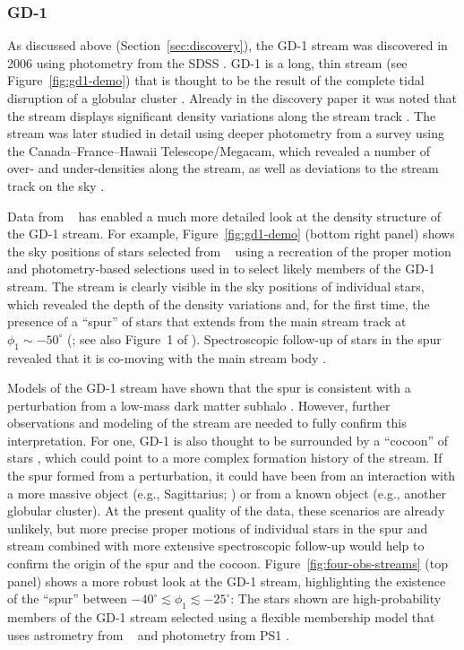 \documentclass[final,5p,times,twocolumn,authoryear]{elsarticle}
\begin{document}
\subsubsection{GD-1}
\label{sec:gd1}

As discussed above (Section~\ref{sec:discovery}), the GD-1 stream was discovered in 2006
using photometry from the SDSS \citep{grillmair:2006-gd1}.
GD-1 is a long, thin stream (see Figure~\ref{fig:gd1-demo}) that is thought to be the
result of the complete tidal disruption of a globular cluster \citep{koposov:2010}.
Already in the discovery paper it was noted that the stream displays significant density
variations along the stream track \citep{grillmair:2006-gd1}.
The stream was later studied in detail using deeper photometry from a survey using the
Canada--France--Hawaii Telescope/Megacam, which revealed a number of over- and
under-densities along the stream, as well as deviations to the stream track
on the sky \citep{deboer:2018}.

Data from \gaia\  has enabled a much more detailed look at the density structure
of the GD-1 stream.
For example, Figure~\ref{fig:gd1-demo} (bottom right panel) shows the sky positions of
stars selected from \gaia\  using a recreation of the proper motion and
photometry-based selections used in \citep{price-whelan:2018} to select likely members
of the GD-1 stream.
The stream is clearly visible in the sky positions of individual stars, which revealed
the depth of the density variations and, for the first time, the presence of a ``spur''
of stars that extends from the main stream track at $\phi_1 \sim -50^\circ$
(\citealt{price-whelan:2018}; see also Figure~1 of \citealt{bonaca:2019b}).
Spectroscopic follow-up of stars in the spur revealed that it is co-moving with the main
stream body \citep{bonaca:2020b}.

Models of the GD-1 stream have shown that the spur is consistent with a perturbation
from a low-mass dark matter subhalo \citep{bonaca:2019, bonaca:2020b}.
However, further observations and modeling of the stream are needed to fully confirm
this interpretation.
For one, GD-1 is also thought to be surrounded by a ``cocoon'' of stars
\citep{malhan:2019a}, which could point to a more complex formation history of the
stream.
If the spur formed from a perturbation, it could have been from an interaction with a
more massive object (e.g., Sagittarius; \citealt{dillamore:2022}) or from a known object
(e.g., another globular cluster).
At the present quality of the data, these scenarios are already unlikely, but more
precise proper motions of individual stars in the spur and stream combined with more
extensive spectroscopic follow-up would help to confirm the origin of the spur and the
cocoon.
Figure~\ref{fig:four-obs-streams} (top panel) shows a more robust look at the GD-1
stream, highlighting the existence of the ``spur'' between $-40^\circ \lesssim \phi_1
\lesssim -25^\circ$: The stars shown are high-probability members of the GD-1 stream
selected using a flexible membership model that uses astrometry from \gaia\  and
photometry from PS1 \citep{tavangar:2024}.
\end{document}
